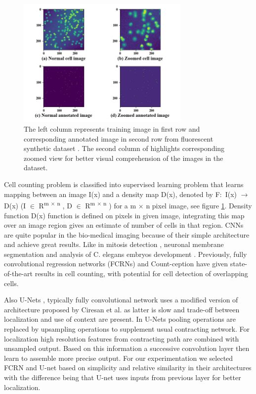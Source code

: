 \documentclass[runningheads]{llncs}
\begin{document}
\begin{figure}[!h]
\centering
\includegraphics[width=0.75\textwidth]{cells-fig-compared.png}
\caption{The left column represents training image in first row and corresponding annotated image in second row from fluorescent synthetic dataset \cite{b29}. The second column of highlights corresponding zoomed view for better visual comprehension of the images in the dataset.}
\label{fig2}
\end{figure}

Cell counting \cite{b15} problem is classified into supervised learning problem that learns mapping between an image I(x) and a density map D(x), denoted by F$\colon$ I(x) $\rightarrow$ D(x) (I $\in$ R\textsuperscript{m $\times$ n} , D $\in$ R\textsuperscript{m $\times$ n} ) for a m $\times$ n pixel image, see figure \ref{fig2}. Density function D(x) function is defined on pixels in given image, integrating this map over an image region gives an estimate of number of cells in that region.  CNNs \cite{b24, b25} are quite popular in the bio-medical imaging because of their simple architecture and achieve great results. Like in mitosis detection \cite{b26}, neuronal membrane segmentation \cite{b27} and analysis of C. elegans embryos development \cite{b28}. Previously, fully convolutional regression networks (FCRNs) and Count-ception have given state-of-the-art results in cell counting, with potential for cell detection of overlapping cells.

Also U-Nets \cite{b8}, typically fully convolutional network uses a modified version of architecture proposed by Ciresan et al. \cite{b27} as latter is slow and trade-off between localization and use of context are present. In U-Nets pooling operations are replaced by upsampling operations to supplement usual contracting network. For localization high resolution features from contracting path are combined with unsampled output. Based on this information a successive convolution layer then learn to assemble more precise output. For our experimentation we selected FCRN and U-net based on simplicity and relative similarity in their architectures with the difference being that U-net uses inputs from previous layer for better localization.
\end{document}
